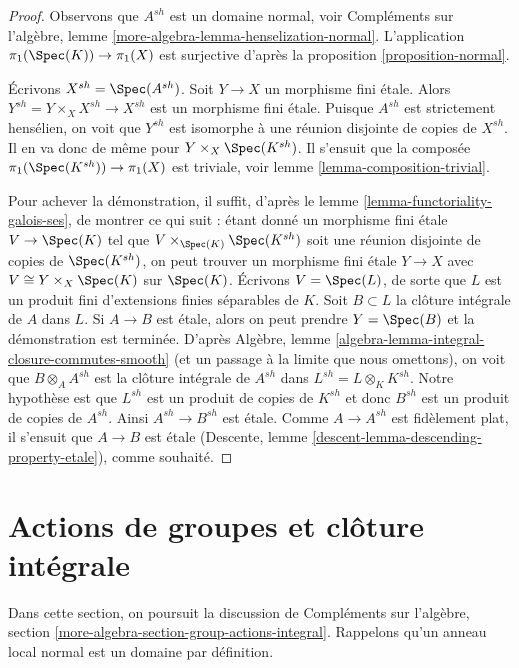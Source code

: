 \begin{proof}
Observons que $A^{sh}$ est un domaine normal, voir
Compléments sur l'algèbre, lemme \ref{more-algebra-lemma-henselization-normal}.
L'application $\pi_1(\Spec(K)) \to \pi_1(X)$ est surjective d'après la
proposition \ref{proposition-normal}.

\medskip\noindent
Écrivons $X^{sh} = \Spec(A^{sh})$. Soit $Y \to X$ un morphisme fini étale.
Alors $Y^{sh} = Y \times_X X^{sh} \to X^{sh}$ est un morphisme fini étale.
Puisque $A^{sh}$ est strictement hensélien, on voit que $Y^{sh}$ est isomorphe
à une réunion disjointe de copies de $X^{sh}$. Il en va donc de même pour
$Y \times_X \Spec(K^{sh})$. Il s'ensuit que la composée
$\pi_1(\Spec(K^{sh})) \to \pi_1(X)$ est triviale, voir
lemme \ref{lemma-composition-trivial}.

\medskip\noindent
Pour achever la démonstration, il suffit, d'après le
lemme \ref{lemma-functoriality-galois-ses},
de montrer ce qui suit : étant donné un morphisme fini étale
$V \to \Spec(K)$ tel que $V \times_{\Spec(K)} \Spec(K^{sh})$
soit une réunion disjointe de copies de $\Spec(K^{sh})$, on peut trouver un
morphisme fini étale
$Y \to X$ avec $V \cong Y \times_X \Spec(K)$ sur $\Spec(K)$.
Écrivons $V = \Spec(L)$, de sorte que $L$ est un produit fini
d'extensions finies séparables de $K$.
Soit $B \subset L$ la clôture intégrale de $A$ dans $L$.
Si $A \to B$ est étale, alors on peut prendre $Y = \Spec(B)$
et la démonstration est terminée. D'après
Algèbre, lemme \ref{algebra-lemma-integral-closure-commutes-smooth}
(et un passage à la limite que nous omettons),
on voit que $B \otimes_A A^{sh}$ est la clôture intégrale de
$A^{sh}$ dans $L^{sh} = L \otimes_K K^{sh}$.
Notre hypothèse est que $L^{sh}$ est un produit de copies de
$K^{sh}$ et donc $B^{sh}$ est un produit de copies de $A^{sh}$.
Ainsi $A^{sh} \to B^{sh}$ est étale. Comme $A \to A^{sh}$ est
fidèlement plat, il s'ensuit que $A \to B$ est étale
(Descente, lemme \ref{descent-lemma-descending-property-etale}),
comme souhaité.
\end{proof}







\section{Actions de groupes et clôture intégrale}
\label{section-group-actions-integral}

\noindent
Dans cette section, on poursuit la discussion de
Compléments sur l'algèbre, section \ref{more-algebra-section-group-actions-integral}.
Rappelons qu'un anneau local normal est un domaine par définition.

